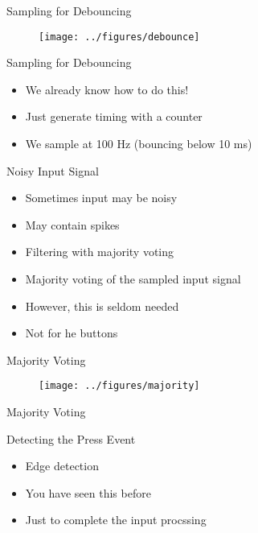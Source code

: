 \begin{frame}[fragile]{Sampling for Debouncing}
\begin{figure}
  \texttt{[image: ../figures/debounce]}
\end{figure}
\end{frame}


\begin{frame}[fragile]{Sampling for Debouncing}
\begin{itemize}
\item We already know how to do this!
\item Just generate timing with a counter
\item We sample at 100 Hz (bouncing below 10 ms)
\end{itemize}
\end{frame}


\begin{frame}[fragile]{Noisy Input Signal}
\begin{itemize}
\item Sometimes input may be noisy
\item May contain spikes
\item Filtering with majority voting
\item Majority voting of the sampled input signal
\item However, this is seldom needed
\item Not for he buttons
\end{itemize}
\end{frame}


\begin{frame}[fragile]{Majority Voting}
\begin{figure}
  \texttt{[image: ../figures/majority]}
\end{figure}
\end{frame}


\begin{frame}[fragile]{Majority Voting}
\end{frame}

\begin{frame}[fragile]{Detecting the Press Event}
\begin{itemize}
\item Edge detection
\item You have seen this before
\item Just to complete the input procssing
\end{itemize}
\end{frame}


